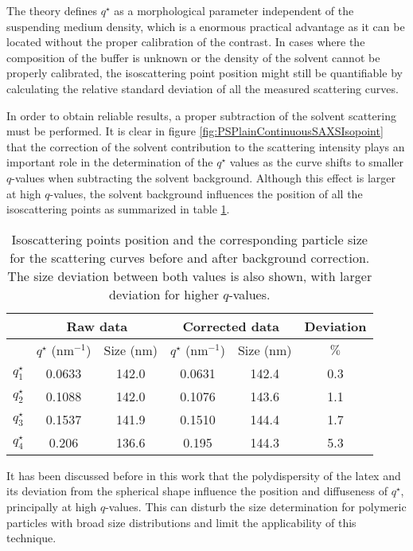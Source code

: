 The theory defines $q^{\star}$ as a morphological parameter independent of the suspending medium density, which is a enormous practical advantage as it can be located without the proper calibration of the contrast. In cases where the composition of the buffer is unknown or the density of the solvent cannot be properly calibrated, the isoscattering point position might still be quantifiable by calculating the relative standard deviation of all the measured scattering curves. 

In order to obtain reliable results, a proper subtraction of the solvent scattering must be performed. It is clear in figure \ref{fig:PSPlainContinuousSAXSIsopoint} that the correction of the solvent contribution to the scattering intensity plays an important role in the determination of the $q^{\star}$ values as the curve shifts to smaller $q$-values when subtracting the solvent background. Although this effect is larger at high $q$-values, the solvent background influences the position of all the isoscattering points as summarized in table \ref{tab:isoscattering_points}. 

\begin{table}
	\centering
	\begin{tabular}{l||cc|cc|c}
		 & \multicolumn{2}{c}{Raw data} & \multicolumn{2}{c}{Corrected data} & Deviation\\
		 \hline
		 & \( q^{\star} \) (nm\(^{-1}\))    &  Size (nm) & \( q^{\star}\) (nm\(^{-1}\))    &  Size (nm) & $\%$ \\
		\hline
		 \(q^{\star}_1\) &  0.0633 & 142.0 &  0.0631 & 142.4 & 0.3 \\
		 \(q^{\star}_2\) &  0.1088 & 142.0 &  0.1076 & 143.6 & 1.1   \\
		 \(q^{\star}_3\) &  0.1537 & 141.9 &  0.1510 & 144.4 & 1.7    \\
		 \(q^{\star}_4\) &  0.206  & 136.6 &  0.195  & 144.3 & 5.3     \\
		\end{tabular}
	\caption{Isoscattering points position and the corresponding particle size for the scattering curves before and after background correction. The size deviation between both values is also shown, with larger deviation for higher $q$-values.}
	\label{tab:isoscattering_points}
\end{table}

It has been discussed before in this work that the polydispersity of the latex and its deviation from the spherical shape influence the position and diffuseness of $q^{\star}$, principally at high $q$-values. This can disturb the size determination for polymeric particles with broad size distributions and limit the applicability of this technique. 

